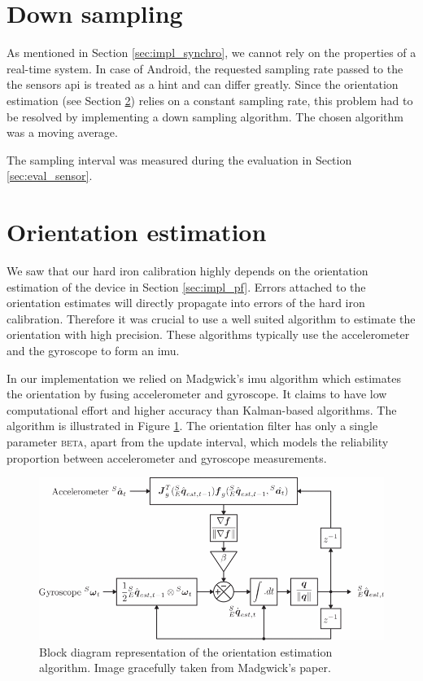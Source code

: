 \section{Down sampling}
\label{sec:impl_downsample}

As mentioned in Section \ref{sec:impl_synchro}, we cannot rely on the properties of a real-time system. In case of Android, the requested sampling rate passed to the the sensors \gls{api} is treated as a hint and can differ greatly. Since the orientation estimation (see Section \ref{sec:ori_est}) relies on a constant sampling rate, this problem had to be resolved by implementing a down sampling algorithm. The chosen algorithm was a moving average.

The sampling interval was measured during the evaluation in Section \ref{sec:eval_sensor}.

\section{Orientation estimation}
\label{sec:ori_est}

We saw that our hard iron calibration highly depends on the orientation estimation of the device in Section \ref{sec:impl_pf}. Errors attached to the orientation estimates will directly propagate into errors of the hard iron calibration. Therefore it was crucial to use a well suited algorithm to estimate the orientation with high precision. These algorithms typically use the accelerometer and the gyroscope to form an \gls{imu}.

In our implementation we relied on Madgwick's \gls{imu} algorithm\cite{madgwick} which estimates the orientation by fusing accelerometer and gyroscope. It claims to have low computational effort and higher accuracy than Kalman-based algorithms. The algorithm is illustrated in Figure \ref{fig:madgwick_imu}. The orientation filter has only a single parameter \textsc{beta}, apart from the update interval, which models the reliability proportion between accelerometer and gyroscope measurements.

\begin{figure}[hbt!]
    \centering
    \includegraphics[width=1.0\textwidth]{figures/madgwick_imu.png}
    \caption{Block diagram representation of the orientation estimation algorithm. Image gracefully taken from Madgwick's paper.\cite{madgwick}}
    \label{fig:madgwick_imu}
\end{figure}


